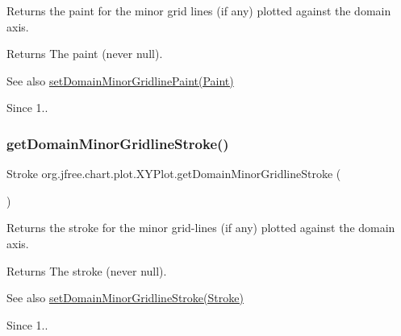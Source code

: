 Returns the paint for the minor grid lines (if any) plotted against the domain axis.

\begin{DoxyReturn}{Returns}
The paint (never {\ttfamily null}).
\end{DoxyReturn}
\begin{DoxySeeAlso}{See also}
\mbox{\hyperlink{classorg_1_1jfree_1_1chart_1_1plot_1_1_x_y_plot_a07e0f74340d81ef71cab595e7c666c0c}{set\+Domain\+Minor\+Gridline\+Paint(\+Paint)}}
\end{DoxySeeAlso}
\begin{DoxySince}{Since}
1.. 
\end{DoxySince}
\mbox{\label{classorg_1_1jfree_1_1chart_1_1plot_1_1_x_y_plot_ad020183a555cde4dfb3ea617cf32f10d}} 
\subsubsection{\texorpdfstring{get\+Domain\+Minor\+Gridline\+Stroke()}{getDomainMinorGridlineStroke()}}
{\footnotesize\ttfamily Stroke org.\+jfree.\+chart.\+plot.\+X\+Y\+Plot.\+get\+Domain\+Minor\+Gridline\+Stroke (\begin{DoxyParamCaption}{ }\end{DoxyParamCaption})}

Returns the stroke for the minor grid-\/lines (if any) plotted against the domain axis.

\begin{DoxyReturn}{Returns}
The stroke (never {\ttfamily null}).
\end{DoxyReturn}
\begin{DoxySeeAlso}{See also}
\mbox{\hyperlink{classorg_1_1jfree_1_1chart_1_1plot_1_1_x_y_plot_ab089f2868ebbb6fc14260b23ca95d553}{set\+Domain\+Minor\+Gridline\+Stroke(\+Stroke)}}
\end{DoxySeeAlso}
\begin{DoxySince}{Since}
1.. 
\end{DoxySince}
\mbox{\label{classorg_1_1jfree_1_1chart_1_1plot_1_1_x_y_plot_aab6b385287de8c012990c2dd3e2ff126}} 
